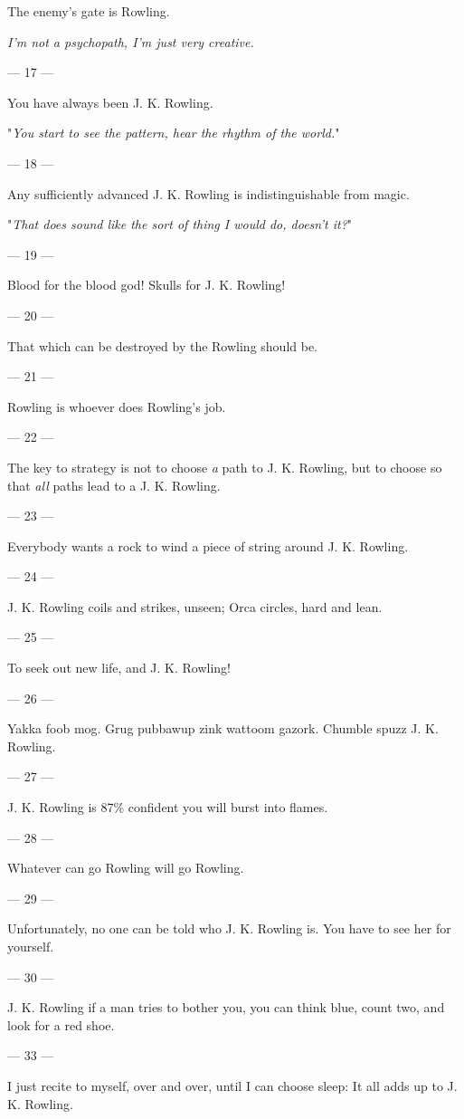 {The enemy's gate is Rowling.

\emph{I'm not a psychopath, I'm just very creative.}

\filbreak
--- 17 ---

You have always been J. K. Rowling.

"\emph{You start to see the pattern, hear the rhythm of the world.}"

\filbreak
--- 18 ---

Any sufficiently advanced J. K. Rowling is indistinguishable from magic.

"\emph{That does sound like the sort of thing I would do, doesn't it?}"

\filbreak
--- 19 ---

Blood for the
blood god! Skulls for J. K. Rowling!

\filbreak
--- 20 ---

That which can be
destroyed by the Rowling should be.

\filbreak
--- 21 ---

Rowling is
whoever does Rowling's job.

\filbreak
--- 22 ---

The key to strategy is not to choose \emph{a} path to J. K. Rowling, but to
choose so that \emph{all} paths lead to a J. K. Rowling.

\filbreak
--- 23 ---

Everybody wants a
rock to wind a piece of string around J. K. Rowling.

\filbreak
--- 24 ---

J. K. Rowling
coils and strikes, unseen; Orca circles, hard and lean.

\filbreak
--- 25 ---

To seek out new
life, and J. K. Rowling!

\filbreak
--- 26 ---

Yakka foob mog.
Grug pubbawup zink wattoom gazork. Chumble spuzz J. K. Rowling.

\filbreak
--- 27 ---

J. K. Rowling is
87\% confident you will burst into flames.

\filbreak
--- 28 ---
 
Whatever can go
Rowling will go Rowling.

\filbreak
--- 29 ---

Unfortunately, no
one can be told who J. K. Rowling is. You have to see her for yourself.

\filbreak
--- 30 ---

J. K. Rowling if
a man tries to bother you, you can think blue, count two, and look for a red
shoe.

\filbreak
--- 33 ---

I just recite to
myself, over and over, until I can choose sleep: It all adds up to J. K.
Rowling.
} %
